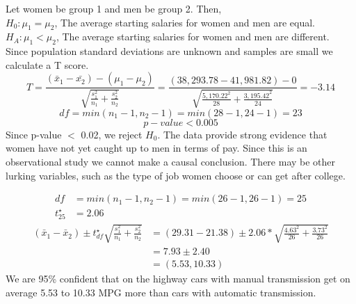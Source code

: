 \pagebreak

{
Let women be group 1 and men be group 2. Then, \\
$H_0: \mu_{1} = \mu_{2}$, The average starting salaries for women and men are equal. \\
$H_A: \mu_{1} < \mu_{2}$, The average starting salaries for women and men are different. \\
Since population standard deviations are unknown and samples are small we calculate a T score.
\[ T = \frac{(\bar{x}_1 - \bar{x_2}) - (\mu_1 - \mu_2)}{\sqrt{ \frac{s_1^2}{n_1} + \frac{s_2^2}{n_2} }} = \frac{(38,293.78 - 41,981.82) - 0}{ \sqrt{\frac{5,170.22 ^2}{28} + \frac{3,195.42 ^2}{24}} } = -3.14 \]
\[ df = min(n_1 - 1, n_2 - 1) = min(28 - 1, 24 - 1) = 23 \]
\[ p-value < 0.005 \]
Since p-value $<$ 0.02, we reject $H_0$. The data provide strong evidence that women have not yet caught up to men in terms of pay. Since this is an observational study we cannot make a causal conclusion. There may be other lurking variables, such as the type of job women choose or can get after college.}
\label{menWomenSalaries}


{
\begin{align*}
df &= min(n_1 - 1, n_2 - 1) = min(26 - 1, 26 - 1) = 25 \\
t^{\star}_{25} &= 2.06
\end{align*}
\begin{align*}
(\bar{x}_1 - \bar{x}_2) \pm t^{\star}_{df} \sqrt{\frac{s_1^2}{n_1} + \frac{s_2^2}{n_2}} &= (29.31 - 21.38) \pm 2.06 * \sqrt{\frac{4.63^2}{26} + \frac{3.73^2}{26}} \\
&= 7.93 \pm 2.40 \\
&= (5.53, 10.33)
\end{align*}
We are 95\% confident that on the highway cars with manual transmission get on average 5.53 to 10.33 MPG more than cars with automatic transmission.
}

